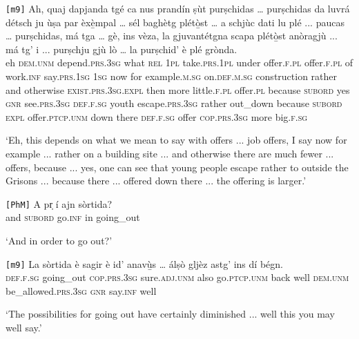 \begin{linenumbers}
	\gll  \texttt{[m9]} Ah, quaj dapjanda tgé ca nus prandín ṣùt purṣchidas … purṣchidas da luvrá détsch ju ùṣa par èxè̱mpal … sél baghètg plétò̱st … a schjùc dati lu plé ... paucas … purṣchidas, má tga … gè, ins vèza, la gjuvantétgna scapa plétò̱st anòragjù ... má tg’ i ... purṣchju gjù lò … la purṣchid’ è plé grònda.\\
	{} eh \textsc{dem.unm} depend.\textsc{prs.3sg} what \textsc{rel} \textsc{1pl} take.\textsc{prs.1pl} under offer.\textsc{f.pl} {} offer.\textsc{f.pl} of work.\textsc{inf} say.\textsc{prs.1sg} \textsc{1sg} now for example.\textsc{m.sg} {} on.\textsc{def.m.sg} construction rather {} and otherwise \textsc{exist.prs.3sg.expl} then more {} little.\textsc{f.pl} {} offer.\textsc{pl} because \textsc{subord} {} yes \textsc{gnr} see.\textsc{prs.3sg} \textsc{def.f.sg} youth escape.\textsc{prs.3sg} rather out\_down {} because \textsc{subord} \textsc{expl} {} offer.\textsc{ptcp.unm} down there {} \textsc{def.f.sg} offer \textsc{cop.prs.3sg} more big.\textsc{f.sg} \\
\end{linenumbers}
\medskip
\glt `Eh, this depends on what we mean to say with offers ... job offers, I say now for example ... rather on a building site ... and otherwise there are much fewer ... offers, because ... yes, one can see that young people escape rather to outside the Grisons ... because there ... offered down there ... the offering is larger.'
\medskip

\begin{linenumbers}
	\gll \texttt{[PhM]} A pr̩ í ajn sòrtida?\\
	{} and \textsc{subord} go.\textsc{inf} in going\_out\\
\end{linenumbers}
\medskip
\glt `And in order to go out?'
\medskip

\begin{linenumbers}
	\gll \texttt{[m9]} La sòrtida è sagir è id’ anavù̱s … álṣò gljèz astg’ ins dí bégn.  \\
	{} \textsc{def.f.sg} going\_out \textsc{cop.prs.3sg} sure.\textsc{adj.unm} also go.\textsc{ptcp.unm} back {} well \textsc{dem.unm} be\_allowed.\textsc{prs.3sg} \textsc{gnr} say.\textsc{inf} well \\
\end{linenumbers}
\medskip
\glt `The possibilities for going out have certainly diminished ... well this you may well say.'
\medskip

